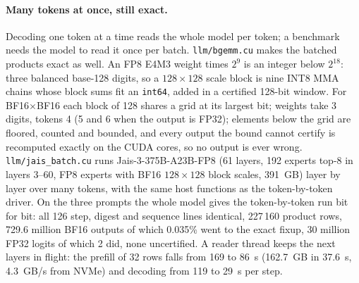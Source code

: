 \documentclass[11pt]{article}
\begin{document}
\paragraph{Many tokens at once, still exact.} Decoding one token at a time reads the whole model per token; a benchmark needs
the model to read it once per batch. \texttt{llm/bgemm.cu} makes the batched products exact as well. An FP8 E4M3 weight times
$2^9$ is an integer below $2^{18}$: three balanced base-128 digits, so a $128\times128$ scale block is nine INT8 MMA chains
whose block sums fit an \texttt{int64}, added in a certified 128-bit window. For BF16$\times$BF16 each block of 128 shares a
grid at its largest bit; weights take 3 digits, tokens 4 (5 and 6 when the output is FP32); elements below the grid are
floored, counted and bounded, and every output the bound cannot certify is recomputed exactly on the CUDA cores, so no output
is ever wrong. \texttt{llm/jais\_batch.cu} runs Jais-3-375B-A23B-FP8 (61 layers, 192 experts top-8 in layers 3--60, FP8
experts with BF16 $128\times128$ block scales, 391~GB) layer by layer over many tokens, with the same host functions as the
token-by-token driver. On the three prompts the whole model gives the token-by-token run bit for bit: all 126 step, digest
and sequence lines identical, 227\,160 product rows, 729.6 million BF16 outputs of which 0.035\% went to the exact fixup,
30 million FP32 logits of which 2 did, none uncertified. A reader thread keeps the next layers in flight: the prefill of 32
rows falls from 169 to 86~s (162.7~GB in 37.6~s, 4.3~GB/s from NVMe) and decoding from 119 to 29~s per step.
\end{document}
